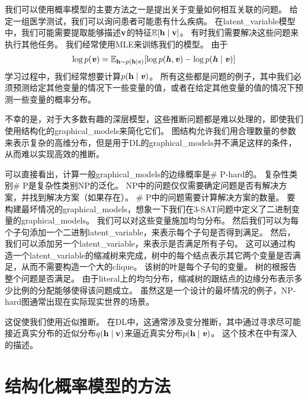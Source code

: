 我们可以使用概率模型的主要方法之一是提出关于变量如何相互关联的问题。 
给定一组医学测试，我们可以询问患者可能患有什么疾病。
在\gls{latent_variable}模型中，我们可能需要提取能够描述$\mathbf{v}$的特征$\mathbb{E}[\mathbf{h} \mid \mathbf{v}]$。
有时我们需要解决这些问题来执行其他任务。 
我们经常使用\gls{MLE}来训练我们的模型。
由于
\begin{align}
\label{eqn:169}
\log p(\boldsymbol{\mathit{v}}) = \mathbb{E}_{\mathbf{h} \sim p(\mathbf{h}\mid \boldsymbol{\mathit{v}})} [\log p(\boldsymbol{\mathit{h}},\boldsymbol{\mathit{v}}) -  \log p(\boldsymbol{\mathit{h}}\mid\boldsymbol{\mathit{v}})]
\end{align}
学习过程中，我们经常想要计算$p(\mathbf{h}\mid\boldsymbol{\mathit{v}})$。
所有这些都是问题的例子，其中我们必须预测给定其他变量的情况下一些变量的值，或者在给定其他变量的值的情况下预测一些变量的概率分布。

不幸的是，对于大多数有趣的深层模型，这些推断问题都是难以处理的，即使我们使用结构化的\gls{graphical_models}来简化它们。
图结构允许我们用合理数量的参数来表示复杂的高维分布，但是用于\gls{DL}的\gls{graphical_models}并不满足这样的条件，从而难以实现高效的推断。


可以直接看出，计算一般\gls{graphical_models}的边缘概率是\# P-hard的。
复杂性类别\# P是复杂性类别NP的泛化。
NP中的问题仅仅需要确定问题是否有解决方案，并找到解决方案（如果存在）。
\# P中的问题需要计算解决方案的数量。
要构建最坏情况的\gls{graphical_models}，想象一下我们在3-SAT问题中定义了二进制变量的\gls{graphical_models}。
我们可以对这些变量施加均匀分布。
然后我们可以为每个子句添加一个二进制\gls{latent_variable}，来表示每个子句是否得到满足。
然后，我们可以添加另一个\gls{latent_variable}，来表示是否满足所有子句。
这可以通过构造一个\gls{latent_variable}的缩减树来完成，树中的每个结点表示其它两个变量是否满足，从而不需要构造一个大的\gls{clique}。
该树的叶是每个子句的变量。
树的根报告整个问题是否满足。
由于literal上的均匀分布，缩减树的跟结点的边缘分布表示多少比例的分配能够使得该问题成立。
虽然这是一个设计的最坏情况的例子，NP-hard图通常出现在实际现实世界的场景。


这促使我们使用近似推断。
在\gls{DL}中，这通常涉及变分推断，其中通过寻求尽可能接近真实分布的近似分布$q(\mathbf{h}\mid\mathbf{v})$来逼近真实分布$p(\mathbf{h}\mid\boldsymbol{\mathit{v}})$。
这个技术在中有深入的描述。



\section{结构化概率模型的方法}
\label{sec:the_deep_learning_approach_to_structured_probabilistic_models}

